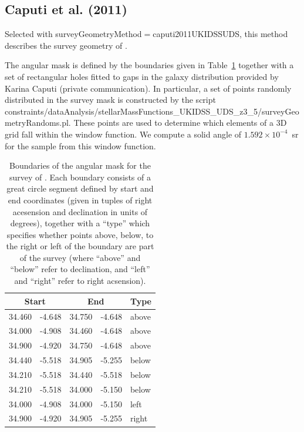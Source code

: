 \subsection{Caputi et al. (2011)}\label{phys:surveyGeometry:surveyGeometryCaputi2011UKIDSSUDS}

Selected with {\normalfont \ttfamily surveyGeometryMethod}$=${\normalfont \ttfamily caputi2011UKIDSSUDS}, this method describes the survey geometry of \cite{caputi_stellar_2011}. 

The angular mask is defined by the boundaries given in Table~\ref{tb:CaputiSurveyBoundaries} together with a set of rectangular holes fitted to gaps in the galaxy distribution provided by Karina Caputi (private communication). In particular, a set of points randomly distributed in the survey mask is constructed by the script {\normalfont \ttfamily constraints/dataAnalysis/stellarMassFunctions\_UKIDSS\_UDS\_z3\_5/surveyGeometryRandoms.pl}. These points are used to determine which elements of a 3D grid fall within the window function. We compute a solid angle of $1.592\times 10^{-4}$~sr for the sample from this window function.

\begin{table}
\caption{Boundaries of the angular mask for the survey of \protect\cite{caputi_stellar_2011}. Each boundary consists of a great circle segment defined by start and end coordinates (given in tuples of right acesension and declination in units of degrees), together with a ``type'' which specifies whether points above, below, to the right or left of the boundary are part of the survey (where ``above'' and ``below'' refer to declination, and ``left'' and ``right'' refer to right acsension).}
\label{tb:CaputiSurveyBoundaries}
\begin{center}
\begin{tabular}{@{(}r@{,}l@{)\,(}r@{,}l@{)\,}l}
\hline
\multicolumn{2}{c}{\normalfont \bfseries Start} & \multicolumn{2}{c}{\normalfont \bfseries End} & {\normalfont \bfseries Type} \\
\hline
 34.460 & -4.648 & 34.750 & -4.648 & above \\
 34.000 & -4.908 & 34.460 & -4.648 & above \\
 34.900 & -4.920 & 34.750 & -4.648 & above \\
 34.440 & -5.518 & 34.905 & -5.255 & below \\
 34.210 & -5.518 & 34.440 & -5.518 & below \\
 34.210 & -5.518 & 34.000 & -5.150 & below \\
 34.000 & -4.908 & 34.000 & -5.150 & left  \\
 34.900 & -4.920 & 34.905 & -5.255 & right \\
\hline
\end{tabular}
\end{center}
\end{table}

